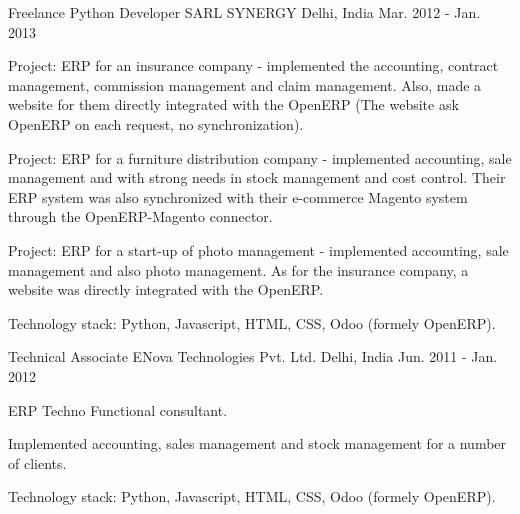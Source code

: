 \begin{cventries}
  \cventry
    {Freelance Python Developer} %
    {SARL SYNERGY} %
    {Delhi, India} %
    {Mar. 2012 - Jan. 2013} %
    {
      \begin{cvitems} %
        \item {Project: ERP for an insurance company - implemented the accounting, contract management, commission management and claim management. Also, made a website for them directly integrated with the OpenERP (The website ask OpenERP on each request, no synchronization).}
        \item {Project: ERP for a furniture distribution company - implemented accounting, sale management and with strong needs in stock management and cost control. Their ERP system was also synchronized with their e-commerce Magento system through the OpenERP-Magento connector.}
        \item {Project: ERP for a start-up of photo management - implemented accounting, sale management and also photo management. As for the insurance company, a website was directly integrated with the OpenERP.}
        \item {Technology stack: Python, Javascript, HTML, CSS, Odoo (formely OpenERP).}
      \end{cvitems}
    }

  \cventry
    {Technical Associate} %
    {ENova Technologies Pvt. Ltd.} %
    {Delhi, India} %
    {Jun. 2011 - Jan. 2012} %
    {
      \begin{cvitems} %
        \item {ERP Techno Functional consultant.}
        \item {Implemented accounting, sales management and stock management for a number of clients.}
        \item {Technology stack: Python, Javascript, HTML, CSS, Odoo (formely OpenERP).}
      \end{cvitems}
    }

\end{cventries}
